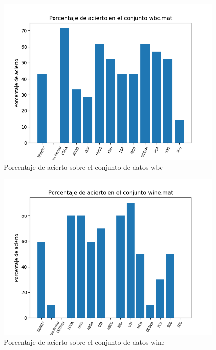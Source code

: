 \begin{figure}[H]
	\centering
	\label{wbc_accuracy}
	\includegraphics[scale=0.7]{imagenes/imgs-exp1/accuracy/wbc}
	\caption{Porcentaje de acierto sobre el conjunto de datos wbc}
\end{figure}

\begin{figure}[H]
	\centering
	\label{wine_accuracy}
	\includegraphics[scale=0.7]{imagenes/imgs-exp1/accuracy/wine}
	\caption{Porcentaje de acierto sobre el conjunto de datos wine}
\end{figure}

